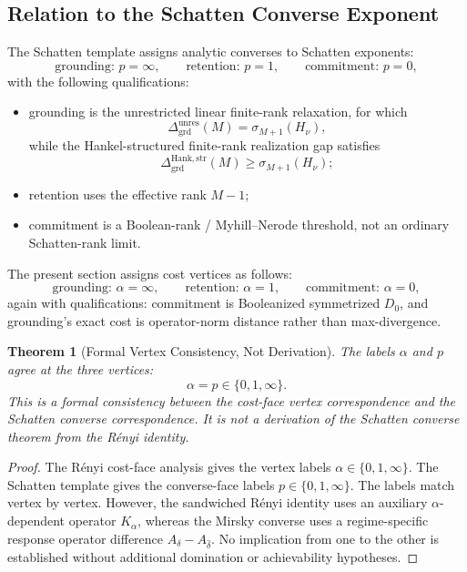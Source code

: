 \documentclass[12pt]{article}
\newtheorem{theorem}{Theorem}[section]
\theoremstyle{definition}
\newcommand{\Dunres}{\Delta_{\mathrm{grd}}^{\mathrm{unres}}}
\newcommand{\DHankstr}{\Delta_{\mathrm{grd}}^{\mathrm{Hank,str}}}
\begin{document}
\subsection{Relation to the Schatten Converse Exponent}
\label{subsec:exponent-schatten-relation}

The Schatten template assigns analytic converses to Schatten exponents:
\[
\text{grounding: }p=\infty,
\qquad
\text{retention: }p=1,
\qquad
\text{commitment: }p=0,
\]
with the following qualifications:
\begin{itemize}[leftmargin=1.6em]
\item grounding is the unrestricted linear finite-rank relaxation, for which
\[
\Dunres(M)=\sigma_{M+1}(H_\nu),
\]
while the Hankel-structured finite-rank realization gap satisfies
\[
\DHankstr(M)\ge\sigma_{M+1}(H_\nu);
\]
\item retention uses the effective rank $M-1$;
\item commitment is a Boolean-rank / Myhill--Nerode threshold, not an
ordinary Schatten-rank limit.
\end{itemize}

The present section assigns cost vertices as follows:
\[
\text{grounding: }\alpha=\infty,
\qquad
\text{retention: }\alpha=1,
\qquad
\text{commitment: }\alpha=0,
\]
again with qualifications: commitment is Booleanized symmetrized $D_0$, and
grounding's exact cost is operator-norm distance rather than max-divergence.

\begin{theorem}[Formal Vertex Consistency, Not Derivation]
\label{thm:vertex-consistency}
The labels $\alpha$ and $p$ agree at the three vertices:
\[
\alpha=p\in\{0,1,\infty\}.
\]
This is a formal consistency between the cost-face vertex correspondence and
the Schatten converse correspondence.  It is not a derivation of the Schatten
converse theorem from the R\'enyi identity.
\end{theorem}

\begin{proof}
The R\'enyi cost-face analysis gives the vertex labels
$\alpha\in\{0,1,\infty\}$.  The Schatten template gives the converse-face
labels $p\in\{0,1,\infty\}$.  The labels match vertex by vertex.  However, the
sandwiched R\'enyi identity uses an auxiliary $\alpha$-dependent operator
$K_\alpha$, whereas the Mirsky converse uses a regime-specific response
operator difference $A_\delta-A_{\widehat\delta}$.  No implication from one to
the other is established without additional domination or achievability
hypotheses.
\end{proof}
\end{document}
